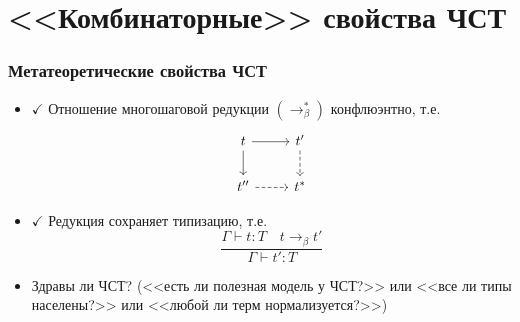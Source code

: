 \documentclass[russian]{beamer}
\begin{document}
\section{<<Комбинаторные>> свойства ЧСТ}
\begin{frame}[fragile]
\frametitle{Метатеоретические свойства ЧСТ}
\begin{itemize}
    \item $\checkmark$ Отношение многошаговой редукции
        $(\to_\beta^*)$ конфлюэнтно, т.е.
        \[\begin{tikzcd}
            t \arrow[r] \arrow[d]
            & t' \arrow[d, dashed] \\
            t'' \arrow[r, dashed] & t^*
        \end{tikzcd}\]
    \item $\checkmark$ Редукция сохраняет типизацию,
        т.е.
        \[\dfrac{\Gamma\vdash t:T\quad t\to_\beta t'}
                {\Gamma\vdash t':T}\]
    \item Здравы ли ЧСТ? (<<есть ли полезная модель у
        ЧСТ?>> или <<все ли типы населены?>> или
        <<любой ли терм нормализуется?>>)
\end{itemize}
\end{frame}
\end{document}
